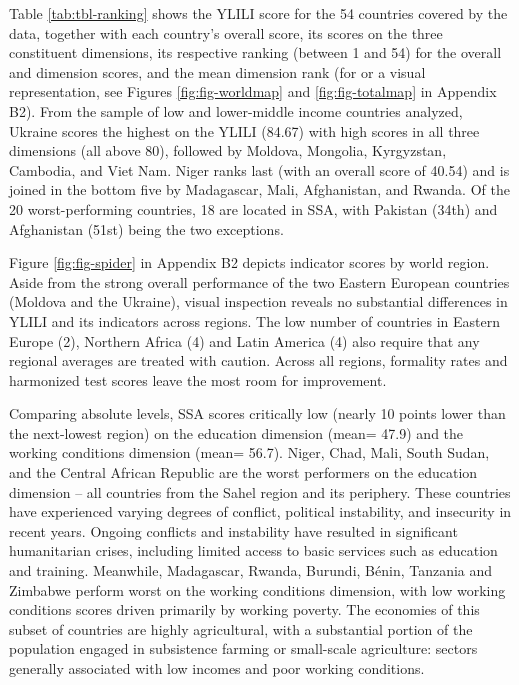 \documentclass[
  a4paper, twoside, 12pt]{book}
\renewcommand{\hl}[1]{#1}
\begin{document}


Table \ref{tab:tbl-ranking} shows the YLILI score for the 54 countries covered by the data, together with each country's overall score, its scores on the three constituent dimensions, its respective ranking (between 1 and 54) for the overall and dimension scores, and the mean dimension rank (for or a visual representation, see Figures \ref{fig:fig-worldmap} and \ref{fig:fig-totalmap} in Appendix B2). From the sample of low and lower-middle income countries analyzed, Ukraine scores the highest on the YLILI (84.67) with high scores in all three dimensions (all above 80), followed by Moldova, Mongolia, Kyrgyzstan, Cambodia, and Viet Nam. Niger ranks last (with an overall score of 40.54) and is joined in the bottom five by Madagascar, Mali, Afghanistan, and Rwanda. Of the 20 worst-performing countries, 18 are located in SSA, with Pakistan (34th) and Afghanistan (51st) being the two exceptions.

Figure \ref{fig:fig-spider} in Appendix B2 depicts indicator scores by world region. Aside from the strong overall performance of the two Eastern European countries (Moldova and the Ukraine), visual inspection reveals no substantial differences in YLILI and its indicators across regions. The low number of countries in Eastern Europe (2), Northern Africa (4) and Latin America (4) also require that any regional averages are treated with caution. Across all regions, formality rates and harmonized test scores leave the most room for improvement.

Comparing absolute levels, SSA scores critically low (nearly 10 points lower than the next-lowest region) on the education dimension (mean= 47.9) and the working conditions dimension (mean= 56.7).  \hl{Niger, Chad, Mali, South Sudan, and the Central African Republic are the worst performers on the education dimension -- all countries from the Sahel region and its periphery. These countries have experienced varying degrees of conflict, political instability, and insecurity in recent years. Ongoing conflicts and instability have resulted in significant humanitarian crises, including limited access to basic services such as education and training. Meanwhile, Madagascar, Rwanda, Burundi, Bénin, Tanzania and Zimbabwe perform worst on the working conditions dimension, with} low working conditions scores driven primarily by working poverty. \hl{The economies of this subset of countries are highly agricultural, with a substantial portion of the population engaged in subsistence farming or small-scale agriculture: sectors generally associated with low incomes and poor working conditions.}
\end{document}
